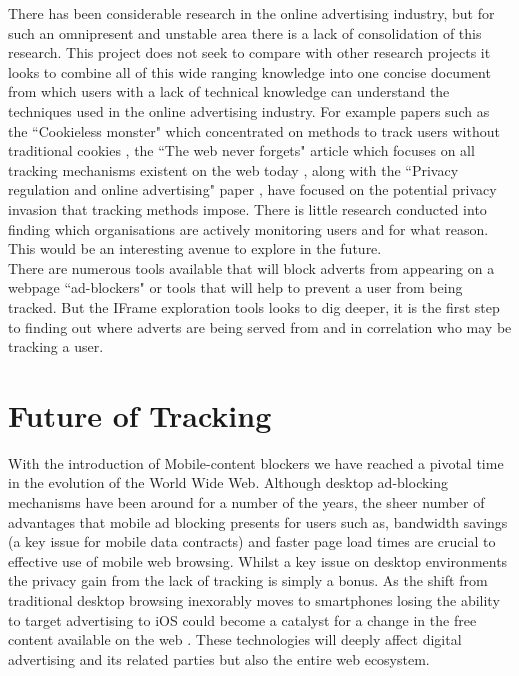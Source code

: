 \documentclass[12pt]{article}
\begin{document}
There has been considerable research in the online advertising industry, but for such an omnipresent and unstable area there is a lack of consolidation of this research. This project does not seek to compare with other research projects it looks to combine all of this wide ranging knowledge into one concise document from which users with a lack of technical knowledge can understand the techniques used in the online advertising industry. For example papers such as the ``Cookieless monster" which concentrated on methods to track users without traditional cookies \parencite{cookielessMonster}, the ``The web never forgets" article which focuses on all tracking mechanisms existent on the web today \parencite{webNeverForgets}, along with the ``Privacy regulation and online advertising" paper \parencite{goldfarb2011privacy}, have focused on the potential privacy invasion that tracking methods impose. There is little research conducted into finding which organisations are actively monitoring users and for what reason. This would be an interesting avenue to explore in the future.  \\

There are numerous tools available that will block adverts from appearing on a webpage ``ad-blockers" or tools that will help to prevent a user from being tracked. But the IFrame exploration tools looks to dig deeper, it is the first step to finding out where adverts are being served from and in correlation who may be tracking a user. 

\section{Future of Tracking}
With the introduction of Mobile-content blockers we have reached a pivotal time in the evolution of the World Wide Web. Although desktop ad-blocking mechanisms have been around for a number of the years, the sheer number of advantages that mobile ad blocking presents for users such as, bandwidth savings (a key issue for mobile data contracts) and faster page load times are crucial to effective use of mobile web browsing. Whilst a key issue on desktop environments the privacy gain from the lack of tracking is simply a bonus. As the shift from traditional desktop browsing inexorably moves to smartphones losing the ability to target advertising to iOS could become a catalyst for a change in the free content available on the web \parencite{tippingPoint}. These technologies will deeply affect digital advertising and its related parties but also the entire web ecosystem. \\
\end{document}
